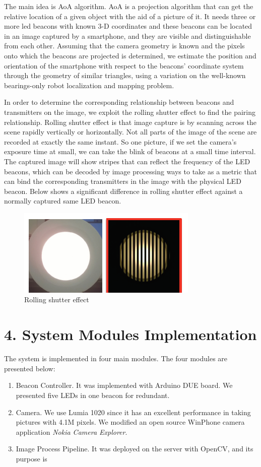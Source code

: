 \documentclass[a4paper, 11pt]{article} %
\begin{document}
The main idea is AoA algorithm. AoA is a projection algorithm that can get the relative location of a given object with the aid of a picture of it. It needs three or more led beacons with known 3-D coordinates and these beacons can be located in an image captured by a smartphone, and they are visible and distinguishable from each other. Assuming that the camera geometry is known and the pixels onto which the beacons are projected is determined, we estimate the position and orientation of the smartphone with respect to the beacons' coordinate system through the geometry of similar triangles, using a variation on the well-known bearings-only robot localization and mapping problem\cite{AoA}.

In order to determine the corresponding relationship between beacons and transmitters on the image, we exploit the rolling shutter effect to find the pairing relationship. Rolling shutter effect is that image capture is by scanning across the scene rapidly vertically or horizontally. Not all parts of the image of the scene are recorded at exactly the same instant. So one picture, if we set the camera's exposure time at small, we can take the blink of beacons at a small time interval. The captured image will show stripes that can reflect the frequency of the LED beacons, which can be decoded by image processing ways to take as a metric that can bind the corresponding transmitters in the image with the physical LED beacon. Below shows a significant difference in rolling shutter effect against a normally captured same LED beacon.

\begin{figure}[h]
	\centering 
	\includegraphics[width=0.8\linewidth]{Figure2.png}
	\caption{Rolling shutter effect}
	\label{fig:subfig}
\end{figure}

\section*{4. System Modules Implementation}
The system is implemented in four main modules. The four modules are presented below:
\begin{enumerate}
	\item Beacon Controller. It was implemented with Arduino DUE board. We presented five LEDs in one beacon for redundant.
	\item Camera. We use Lumia 1020 since it has an excellent performance in taking pictures with 4.1M pixels. We modified an open source WinPhone camera application \textit{Nokia Camera Explorer\cite{NCE}}. 
	\item Image Process Pipeline. It was deployed on the server with OpenCV, and its purpose is 
\end{enumerate}
\end{document}
